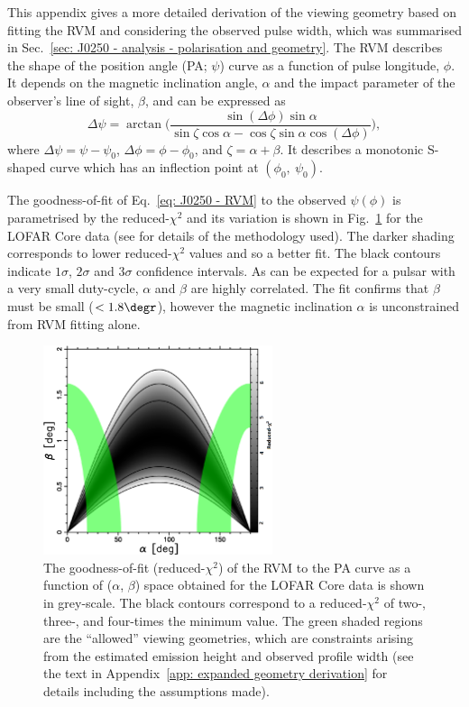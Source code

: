 This appendix gives a more detailed derivation of the viewing geometry based on fitting the RVM and considering the observed pulse width, which was summarised in Sec.~\ref{sec: J0250 - analysis - polarisation and geometry}. The RVM describes the shape of the position angle (PA; $\psi$) curve as a function of pulse longitude, $\phi$. It depends on the magnetic inclination angle, $\alpha$ and the impact parameter of the observer's line of sight, $\beta$, and can be expressed as 
\begin{equation}
	\label{eq: J0250 - RVM}
		\Delta\psi = \arctan\bigg(  \frac{\sin(\Delta\phi) \sin\alpha }{\sin\zeta\cos\alpha - \cos\zeta\sin\alpha\cos(\Delta\phi) }  \bigg),
\end{equation}
where $\Delta\psi = \psi - \psi_0$, $\Delta\phi = \phi - \phi_0$, and $\zeta = \alpha + \beta$. It describes a monotonic S-shaped curve which has an inflection point at $(\phi_0,\ \psi_0)$.

The goodness-of-fit of Eq.~\eqref{eq: J0250 - RVM} to the observed $\psi(\phi)$ is parametrised by the reduced-$\chi^2$ and its variation is shown in Fig.~\ref{fig: J0250 - banana} for the LOFAR Core data (see \citealt{RWJx2015a} for details of the methodology used). The darker shading corresponds to lower reduced-$\chi^2$ values and so a better fit. The black contours indicate $1\sigma$, $2\sigma$ and $3\sigma$ confidence intervals. As can be expected for a pulsar with a very small duty-cycle, $\alpha$ and $\beta$ are highly correlated. The fit confirms that $\beta$ must be small ($<1.8\degr$), however the magnetic inclination $\alpha$ is unconstrained from RVM fitting alone.

\begin{figure}
    \begin{center}
        \includegraphics[width=0.6\textwidth]{Figures/J0250/banana}
        \caption[The goodness-of-fit of the RVM to the PSR~J0250+5854 PA curve]{The goodness-of-fit (reduced-$\chi^2$) of the RVM to the PA curve as a function of ($\alpha$, $\beta$) space obtained for the LOFAR Core data is shown in grey-scale. The black contours correspond to a reduced-$\chi^2$ of two-, three-, and four-times the minimum value. The green shaded regions are the ``allowed'' viewing geometries, which are constraints arising from the estimated emission height and observed profile width (see the text in Appendix~\ref{app: expanded geometry derivation} for details including the assumptions made).}
        \label{fig: J0250 - banana}
    \end{center}
\end{figure}


